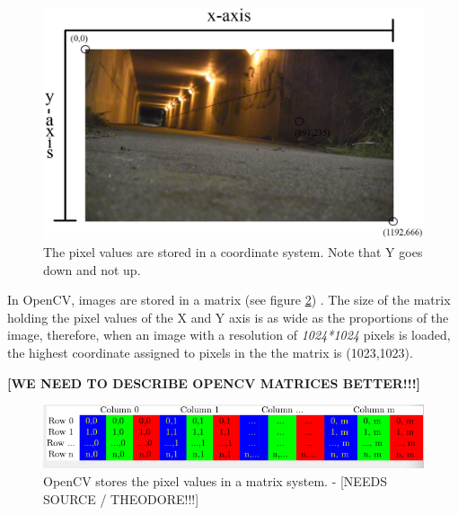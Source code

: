 \begin{figure}[htbp]
\centering
\includegraphics[width=1.00\textwidth]{Pictures/Theory/IndexingAPicture}
\caption{The pixel values are stored in a coordinate system. Note that Y goes down and not up.}
\label{fig:ip_IndexingAPicture}
\end{figure} 

In OpenCV, images are stored in a matrix (see figure \ref{fig:opencv_matrix}) . The size of the matrix holding the pixel values of the X and Y axis is as wide as the proportions of the image, therefore, when an image with a resolution of \textit{1024*1024} pixels is loaded, the highest coordinate assigned to pixels in the the matrix is (1023,1023).

\textbf{[WE NEED TO DESCRIBE OPENCV MATRICES BETTER!!!]}

\begin{figure}[htbp]
\centering
\includegraphics[width=1.00\textwidth]{Pictures/Theory/opencv_matrix}
\caption{OpenCV stores the pixel values in a matrix system. - [NEEDS SOURCE / THEODORE!!!]}
\label{fig:opencv_matrix}
\end{figure} 

